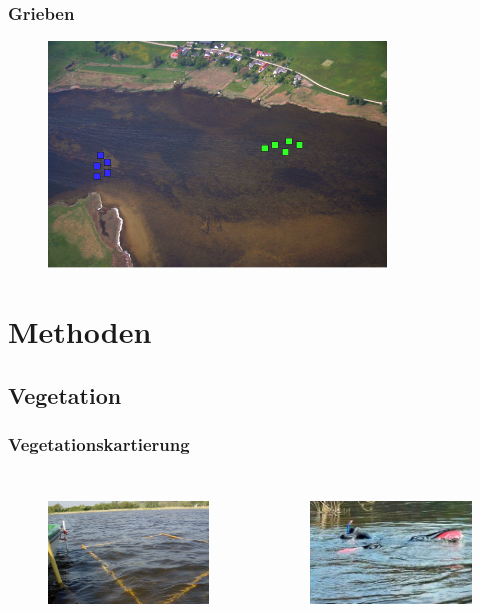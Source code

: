 \documentclass{beamer}
\begin{document}
\begin{frame}
\frametitle{Grieben}
\begin{figure}
\includegraphics[width=0.8\textwidth]{images/Fotos/griebenerbucht.png}
\end{figure}
\end{frame}

\section{Methoden}
\subsection{Vegetation}

\begin{frame}
\frametitle{Vegetationskartierung}
\begin{columns}
\begin{column}{5.5cm}
\begin{figure}
\includegraphics[height=35mm]{images/Fotos/vegetationsrahmen.jpg}
\end{figure}
\end{column}
\begin{column}{5.5cm}
\begin{figure}
\includegraphics[height=35mm]{images/Fotos/schnorchelnklein2.jpg}
\vspace*{+5mm}
\end{figure}
\end{column}
\end{columns}
\end{frame}
\end{document}
